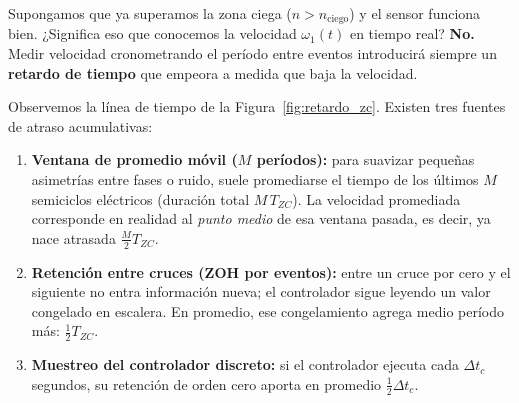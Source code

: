 \documentclass[11pt,a4paper,oneside]{book}
\begin{document}
Supongamos que ya superamos la zona ciega ($n > n_{\text{ciego}}$) y el sensor
funciona bien. ¿Significa eso que conocemos la velocidad $\omega_1(t)$ en tiempo
real? \textbf{No.} Medir velocidad cronometrando el período entre eventos
introducirá siempre un \textbf{retardo de tiempo} que empeora a medida que baja
la velocidad.

Observemos la línea de tiempo de la Figura~\ref{fig:retardo_zc}. Existen tres
fuentes de atraso acumulativas:
\begin{enumerate}
  \item \textbf{Ventana de promedio móvil ($M$ períodos):} para suavizar pequeñas
        asimetrías entre fases o ruido, suele promediarse el tiempo de los
        últimos $M$ semiciclos eléctricos (duración total $M\,T_{ZC}$). La
        velocidad promediada corresponde en realidad al \emph{punto medio} de
        esa ventana pasada, es decir, ya nace atrasada $\frac{M}{2}T_{ZC}$.
  \item \textbf{Retención entre cruces (ZOH por eventos):} entre un cruce por
        cero y el siguiente no entra información nueva; el controlador sigue
        leyendo un valor congelado en escalera. En promedio, ese congelamiento
        agrega medio período más: $\frac{1}{2}T_{ZC}$.
  \item \textbf{Muestreo del controlador discreto:} si el controlador ejecuta
        cada $\Delta t_c$ segundos, su retención de orden cero aporta en promedio
        $\frac{1}{2}\Delta t_c$.
\end{enumerate}
\end{document}
